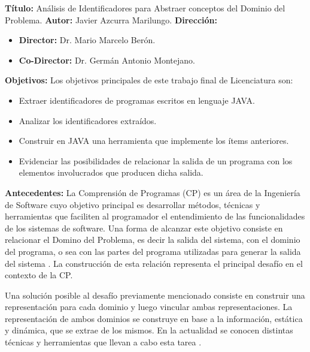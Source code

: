 \documentclass[a4paper,12pt]{report}
\begin{document}
{\Large \textbf{Título:}} Análisis de Identificadores para Abstraer conceptos del Dominio del Problema.
\vskip0.5cm
\textbf{Autor:} Javier Azcurra Marilungo.
\vskip0.5cm
\textbf{Dirección:}
\begin{itemize}
\itemsep0em%
\item \textbf{Director:} Dr. Mario Marcelo Berón.

\item \textbf{Co-Director:} Dr. Germán Antonio Montejano.
\end{itemize}

\textbf{Objetivos:} Los objetivos principales de este trabajo final de Licenciatura son:
\begin{itemize}
\itemsep0em%
\item Extraer identificadores de programas escritos en lenguaje JAVA.

\item Analizar los identificadores extraídos.

\item Construir en JAVA una herramienta que implemente los ítems anteriores.

\item Evidenciar las posibilidades de relacionar la salida de un programa con los elementos involucrados que producen dicha salida.
\end{itemize}

\textbf{Antecedentes:}
\vskip0.5cm
\hspace{0.5cm} La Comprensión de Programas (CP) \cite{BRM10,MPMR07,MBPHRU10,MAS05} es un área de la Ingeniería de Software cuyo objetivo 
principal es desa\-rrollar métodos, técnicas y herramientas que faciliten al programador 
el entendimiento de las funcionalidades de los sistemas de software.
Una forma de alcanzar este objetivo consiste en relacionar el Domino del Problema, 
es decir la salida del sistema, con el dominio del programa, o sea 
con las partes del programa utilizadas para generar la salida del sistema \cite{VMAVA95,MPOB03,BROOK82}.
La construcción de esta relación representa el principal desafío en el contexto de la 
CP. 

\hspace{0.5cm}Una solución posible al desafío previamente mencionado consiste en construir 
una representación para cada dominio y luego vincular ambas representaciones.
La representación de ambos dominios se construye en base a la información, 
estática y dinámica, que se extrae de los mismos. En la actualidad se conocen distintas técnicas y herramientas que llevan a cabo esta tarea \cite{AHUL06,THBE99}.
 
\end{document}
